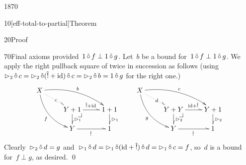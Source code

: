 \begin{parsec}{1870}
\begin{point}{10}[eff-total-to-partial]{Theorem}
\begin{point}{20}{Proof}
\begin{point}{70}{Final axioms}
    provided~$1 \mathop{\hat\circ} f \perp 1 \mathop{\hat\circ} g$.
Let~$b$ be a bound for~$1 \mathop{\hat\circ} f \perp 1 \mathop{\hat\circ} g$.
We apply the right pullback square of 
    twice  in succession as follows
    (using~$\mathord{\vartriangleright}_2 \mathop{\hat\circ} c
                = \mathord{\vartriangleright}_2 \mathop{\hat\circ} (\hat{!} + \mathrm{id}) \mathop{\hat\circ} c
                = \mathord{\vartriangleright}_2 \mathop{\hat\circ} b = 1\mathop{\hat\circ} g$ for the right one.)
\begin{equation*}
    \xymatrix@R-.8pc{
        X \ar@^{.>}[rd]|{c}
    \ar@/^1pc/[rrd]^{b}
        \ar@/_1pc/[rdd]_f
        \\& Y+1 \pullback
        \ar@^{>}[r]^{\hat! + \id}
        \ar@^{>}[d]^{\pproj_1}
    & 1+1
        \ar@^{>}[d]^{\pproj_1}
        \\& Y
        \ar@^{>}[r]_{\hat!}
&1
} \qquad
    \xymatrix@R-.8pc{
        X \ar@^{.>}[rd]|{d}
    \ar@/^1pc/[rrd]^{c}
        \ar@/_1pc/[rdd]_g
        \\& Y+Y \pullback
        \ar@^{>}[r]^{\id + \hat!}
        \ar@^{>}[d]^{\pproj_2}
    & Y+1
        \ar@^{>}[d]^{\pproj_2}
        \\& Y
        \ar@^{>}[r]_{\hat!}
&1
}
\end{equation*}
Clearly~$\mathord{\vartriangleright}_2 \mathop{\hat\circ} d = g$
    and~$
    \mathord{\vartriangleright}_1 \mathop{\hat\circ} d
     =  \mathord{\vartriangleright}_1 \mathop{\hat\circ} (\mathrm{id} + \hat! )\mathop{\hat\circ} d
     =  \mathord{\vartriangleright}_1 \mathop{\hat\circ} c  =  f$, so~$d$ is a bound for~$f \perp g$,
     as desired. \qed
\end{point}
\end{point}
\end{point}
\end{parsec}
